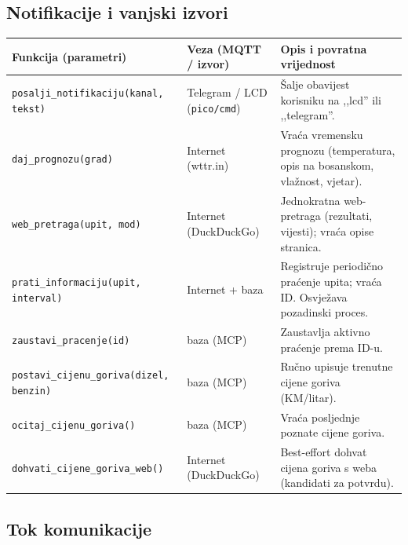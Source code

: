 \documentclass[11pt,a4paper]{article}
\begin{document}
\subsection{Notifikacije i vanjski izvori}
{\small
      \begin{tabularx}{\textwidth}{@{}L{0.32\textwidth} L{0.20\textwidth} X@{}}
            \toprule
            \textbf{Funkcija (parametri)}                   & \textbf{Veza (MQTT / izvor)}       & \textbf{Opis i povratna vrijednost}                                          \\
            \midrule
            \texttt{posalji\_notifikaciju(kanal, tekst)}    & Telegram / LCD (\texttt{pico/cmd}) & Šalje obavijest korisniku na ,,lcd'' ili ,,telegram''.                       \\
            \texttt{daj\_prognozu(grad)}                    & Internet (wttr.in)                 & Vraća vremensku prognozu (temperatura, opis na bosanskom, vlažnost, vjetar). \\
            \texttt{web\_pretraga(upit, mod)}               & Internet (DuckDuckGo)              & Jednokratna web-pretraga (rezultati, vijesti); vraća opise stranica.         \\
            \texttt{prati\_informaciju(upit, interval)}     & Internet + baza                    & Registruje periodično praćenje upita; vraća ID. Osvježava pozadinski proces. \\
            \texttt{zaustavi\_pracenje(id)}                 & baza (MCP)                         & Zaustavlja aktivno praćenje prema ID-u.                                      \\
            \texttt{postavi\_cijenu\_goriva(dizel, benzin)} & baza (MCP)                         & Ručno upisuje trenutne cijene goriva (KM/litar).                             \\
            \texttt{ocitaj\_cijenu\_goriva()}               & baza (MCP)                         & Vraća posljednje poznate cijene goriva.                                      \\
            \texttt{dohvati\_cijene\_goriva\_web()}         & Internet (DuckDuckGo)              & Best-effort dohvat cijena goriva s weba (kandidati za potvrdu).              \\
            \bottomrule
      \end{tabularx}
}


\subsection{Tok komunikacije}
\end{document}
